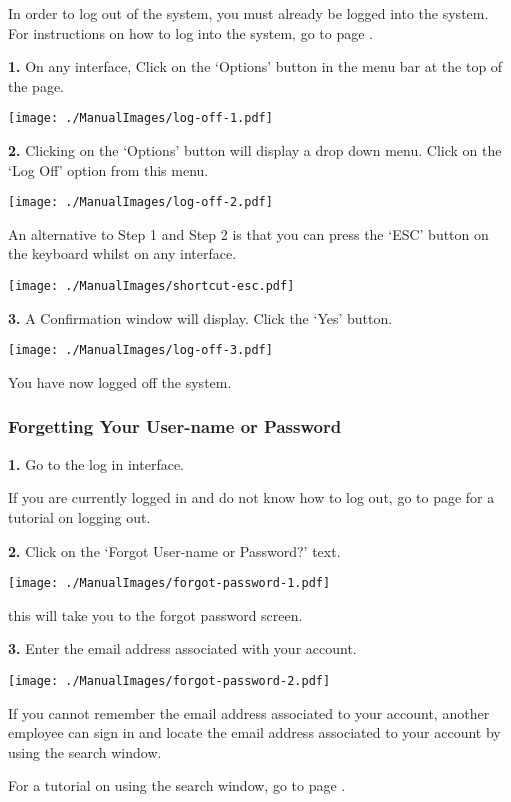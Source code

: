 In order to log out of the system, you must already be logged into the system. For instructions on how to log into the system, go to page \pageref{fig:Logging into the system}.

\textbf{1.}  On any interface, Click on the `Options' button in the menu bar at the top of the page.

\texttt{[image: ./ManualImages/log-off-1.pdf]}

\textbf{2.} Clicking on the `Options' button will display a drop down menu. Click on the `Log Off' option from this menu.

\texttt{[image: ./ManualImages/log-off-2.pdf]}

An alternative to Step 1 and Step 2 is that you can press the `ESC' button on the keyboard whilst on any interface.

\texttt{[image: ./ManualImages/shortcut-esc.pdf]}

\textbf{3.} A Confirmation window will display. Click the `Yes' button.

\texttt{[image: ./ManualImages/log-off-3.pdf]}

You have now logged off the system.

\pagebreak
\subsubsection{Forgetting Your User-name or Password}
\label{fig:Forgetting Your User-name or Password}

\textbf{1.} Go to the log in interface.

If you are currently logged in and do not know how to log out, go to page \pageref{fig:Logging out of the system}  for a tutorial on logging out.

\textbf{2.} Click on the `Forgot User-name or Password?' text.

\texttt{[image: ./ManualImages/forgot-password-1.pdf]}

this will take you to the forgot password screen.

\textbf{3.} Enter the email address associated with your account.

\texttt{[image: ./ManualImages/forgot-password-2.pdf]}

If you cannot remember the email address associated to your account, another employee can sign in and locate the email address associated to your account by using the search window.

For a tutorial on using the search window, go to page \pageref{fig:Accessing the search window}.

